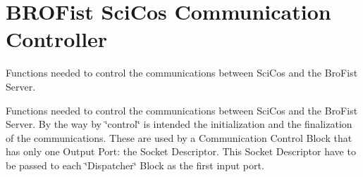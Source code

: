 \hypertarget{group___b_r_o_cos_comm_contr}{
\section{BROFist SciCos Communication Controller}
\label{group___b_r_o_cos_comm_contr}
}


Functions needed to control the communications between SciCos and the BroFist Server.  


Functions needed to control the communications between SciCos and the BroFist Server. By the way by \char`\"{}control\char`\"{} is intended the initialization and the finalization of the communications. These are used by a Communication Control Block that has only one Output Port: the Socket Descriptor. This Socket Descriptor have to be passed to each \char`\"{}Dispatcher\char`\"{} Block as the first input port. 